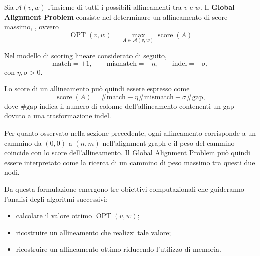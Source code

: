 Sia $\mathcal{A}(v,w)$ l'insieme di tutti i possibili allineamenti tra $v$ e $w$.
Il \textbf{Global Alignment Problem} consiste nel determinare un allineamento di score massimo,
\cite[pp.~177--180]{jones--pevzner}, ovvero
\[
    \operatorname{OPT}(v,w) = \max_{A \in \mathcal{A}(v,w)} \operatorname{score}(A)
\]

Nel modello di scoring lineare considerato di seguito,
\[
    \text{match}= +1,\qquad \text{mismatch}= -\eta,\qquad \text{indel}= -\sigma,
\]
con $\eta, \sigma>0$.

Lo score di un allineamento può quindi essere espresso come
\[
    \operatorname{score}(A) = \# \text{match} - \eta\#\text{mismatch} - \sigma\#\text{gap},
\]
dove $\#\text{gap}$ indica il numero di colonne dell'allineamento contenenti un gap dovuto a una trasformazione indel.

Per quanto osservato nella sezione precedente, ogni allineamento corrisponde a un cammino da $(0,0)$ a $(n,m)$ nell'alignment graph e 
il peso del cammino coincide con lo score dell'allineamento.
Il Global Alignment Problem può quindi essere interpretato come la ricerca di un cammino di peso massimo tra questi due nodi.
    
Da questa formulazione emergono tre obiettivi computazionali che guideranno l'analisi degli algoritmi successivi:
\begin{itemize}
    \item calcolare il valore ottimo $\operatorname{OPT}(v,w)$;
    \item ricostruire un allineamento che realizzi tale valore;
    \item ricostruire un allineamento ottimo riducendo l'utilizzo di memoria.
\end{itemize}
